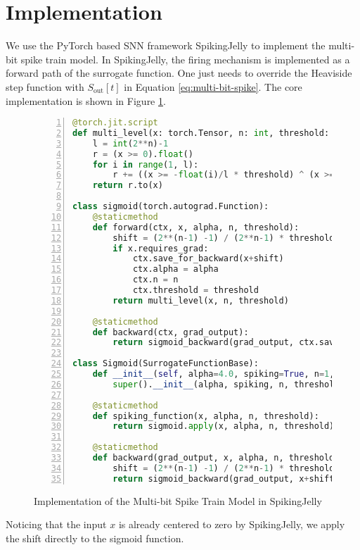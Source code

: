 \section{Implementation}
\label{sec:implementation}

    We use the PyTorch based SNN framework SpikingJelly to implement the multi-bit spike train model. In SpikingJelly, the firing mechanism is implemented as a forward path of the surrogate function. One just needs to override the Heaviside step function with $S_{\text{out}}[t]$ in Equation \ref{eq:multi-bit-spike}. The core implementation is shown in Figure \ref{listing:multi-bit-spike}.
    \begin{figure}[!htpb]
        \centering
        \begin{lstlisting}[language=Python, basicstyle=\small\ttfamily, breaklines=true, numbers=left, stepnumber=1]
@torch.jit.script
def multi_level(x: torch.Tensor, n: int, threshold: float):
    l = int(2**n)-1
    r = (x >= 0).float()
    for i in range(1, l):
        r += ((x >= -float(i)/l * threshold) ^ (x >= -float(i-1)/l * threshold)) * float(l-i)/l
    return r.to(x)

class sigmoid(torch.autograd.Function):
    @staticmethod
    def forward(ctx, x, alpha, n, threshold):
        shift = (2**(n-1) -1) / (2**n-1) * threshold
        if x.requires_grad:
            ctx.save_for_backward(x+shift)
            ctx.alpha = alpha
            ctx.n = n
            ctx.threshold = threshold
        return multi_level(x, n, threshold)

    @staticmethod
    def backward(ctx, grad_output):
        return sigmoid_backward(grad_output, ctx.saved_tensors[0], ctx.alpha, ctx.n, ctx.threshold)

class Sigmoid(SurrogateFunctionBase):
    def __init__(self, alpha=4.0, spiking=True, n=1, threshold=1.0):
        super().__init__(alpha, spiking, n, threshold)

    @staticmethod
    def spiking_function(x, alpha, n, threshold):
        return sigmoid.apply(x, alpha, n, threshold)

    @staticmethod
    def backward(grad_output, x, alpha, n, threshold):
        shift = (2**(n-1) -1) / (2**n-1) * threshold
        return sigmoid_backward(grad_output, x+shift, alpha, n, threshold)[0]
        \end{lstlisting}
        \caption{Implementation of the Multi-bit Spike Train Model in SpikingJelly}
        \label{listing:multi-bit-spike}
    \end{figure}

    Noticing that the input $x$ is already centered to zero by SpikingJelly, we apply the shift directly to the sigmoid function. 
